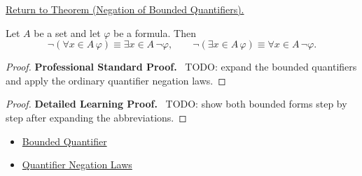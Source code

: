 \newpage
{}
\label{prf:neg-bounded}

\begin{remark*}[Return]
\hyperref[thm:neg-bounded]{Return to Theorem (Negation of Bounded Quantifiers).}
\end{remark*}

\begin{theorem*}
Let \(A\) be a set and let \(\varphi\) be a formula. Then
\[
\neg(\forall x\in A\,\varphi)\equiv \exists x\in A\,\neg\varphi,
\qquad
\neg(\exists x\in A\,\varphi)\equiv \forall x\in A\,\neg\varphi.
\]
\end{theorem*}

\begin{proof}
\textbf{Professional Standard Proof.}~
TODO: expand the bounded quantifiers and apply the ordinary quantifier
negation laws.
\end{proof}

\begin{proof}
\textbf{Detailed Learning Proof.}~
TODO: show both bounded forms step by step after expanding the abbreviations.
\end{proof}

\begin{remark*}
\end{remark*}

\begin{dependencies}
\begin{itemize}
  \item \hyperref[def:bounded-q]{Bounded Quantifier}
  \item \hyperref[thm:qneg]{Quantifier Negation Laws}
\end{itemize}
\end{dependencies}

\clearpage
